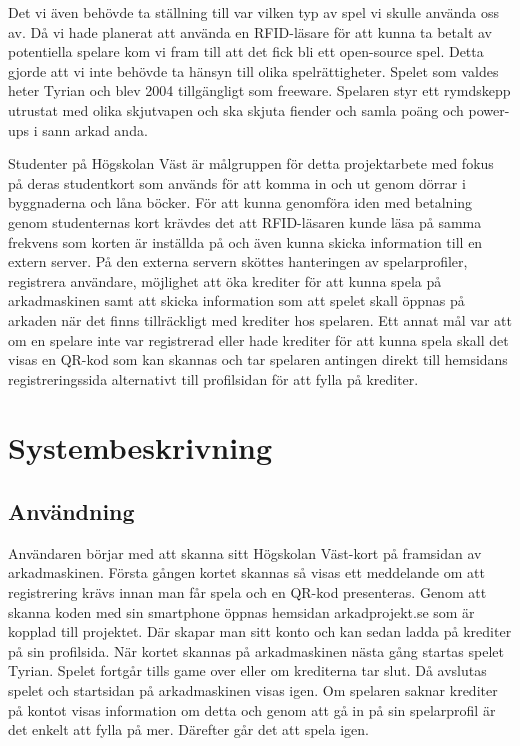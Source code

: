 \documentclass[12pt,fleqn,openany]{book} %
\begin{document}
Det vi även behövde ta ställning till var vilken typ av spel vi skulle använda oss av. Då vi hade planerat att använda en RFID-läsare 
för att kunna ta betalt av potentiella spelare kom vi fram till att det fick bli ett open-source spel. Detta gjorde att vi inte behövde 
ta hänsyn till olika spelrättigheter. Spelet som valdes heter Tyrian och blev 2004 tillgängligt som freeware. Spelaren styr ett rymdskepp 
utrustat med olika skjutvapen och ska skjuta fiender och samla poäng och power-ups i sann arkad anda.
\bigskip

Studenter på Högskolan Väst är målgruppen för detta projektarbete med fokus på deras studentkort som används för att komma in och ut genom 
dörrar i byggnaderna och låna böcker. För att kunna genomföra iden med betalning genom studenternas kort krävdes det att RFID-läsaren kunde 
läsa på samma frekvens som korten är inställda på och även kunna skicka information till en extern server. På den externa servern sköttes 
hanteringen av spelarprofiler, registrera användare, möjlighet att öka krediter för att kunna spela på arkadmaskinen samt att skicka 
information som att spelet skall öppnas på arkaden när det finns tillräckligt med krediter hos spelaren. Ett annat mål var att om en 
spelare inte var registrerad eller hade krediter för att kunna spela skall det visas en QR-kod som kan skannas och tar spelaren antingen 
direkt till hemsidans registreringssida alternativt till profilsidan för att fylla på krediter.

\section{Systembeskrivning}
\subsection{Användning}
Användaren börjar med att skanna sitt Högskolan Väst-kort på framsidan av arkadmaskinen. Första gången kortet skannas så visas ett 
meddelande om att registrering krävs innan man får spela och en QR-kod presenteras. Genom att skanna koden med sin smartphone öppnas 
hemsidan arkadprojekt.se som är kopplad till projektet. Där skapar man sitt konto och kan sedan ladda på krediter på sin profilsida. 
När kortet skannas på arkadmaskinen nästa gång startas spelet Tyrian. Spelet fortgår tills game over eller om krediterna tar slut. 
Då avslutas spelet och startsidan på arkadmaskinen visas igen. Om spelaren saknar krediter på kontot visas information om detta och 
genom att gå in på sin spelarprofil är det enkelt att fylla på mer. Därefter går det att spela igen.
\end{document}
